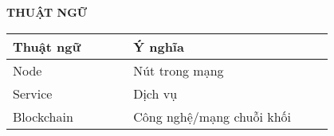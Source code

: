 \documentclass[../DoAn.tex]{subfiles}
\begin{document}
\begin{center}
	{\textbf{THUẬT NGỮ}}\\
\end{center}
\vspace{1cm}
\begin{longtable}{p{0.3\linewidth} p{0.5\linewidth}}
	\hline
	\textbf{Thuật ngữ}  & \textbf{Ý nghĩa}          \\ \hline
	Node       & Nút trong mạng            \\
	Service    & Dịch vụ                   \\
	Blockchain & Công nghệ/mạng chuỗi khối \\
	\hline
\end{longtable}
\end{document}
